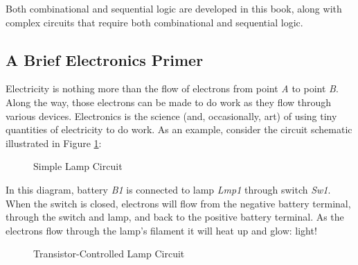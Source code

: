 Both combinational and sequential logic are developed in this book, along with complex circuits that require both combinational and sequential logic.

\subsection{A Brief Electronics Primer}

Electricity is nothing more than the flow of electrons from point \emph{A} to point \emph{B}. Along the way, those electrons can be made to do work as they flow through various devices. Electronics is the science (and, occasionally, art) of using tiny quantities of electricity to do work. As an example, consider the circuit schematic illustrated in Figure \ref{IN:fig:simple_lamp_circuit}:

\begin{figure}[htb]
  \myfloatalign
  \caption{Simple Lamp Circuit}
  \label{IN:fig:simple_lamp_circuit}
\end{figure}

In this diagram, battery \emph{B1} is connected to lamp \emph{Lmp1} through switch \emph{Sw1}. When the switch is closed, electrons will flow from the negative battery terminal, through the switch and lamp, and back to the positive battery terminal. As the electrons flow through the lamp's filament it will heat up and glow: light! 

\begin{figure}[htb]
  \myfloatalign
  \caption{Transistor-Controlled Lamp Circuit}
  \label{IN:fig:xistor_lamp_circuit}
\end{figure}


